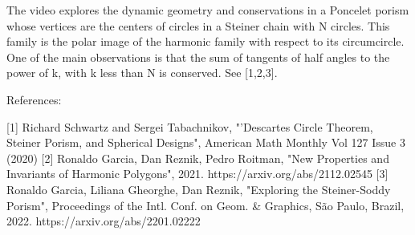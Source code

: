 The video explores the dynamic geometry and conservations in a Poncelet porism whose vertices are the centers of circles in a Steiner chain with N circles. This family is the polar image of the harmonic family with respect to its circumcircle. One of the main observations is that the sum of tangents of half angles to the power of k, with k less than N is conserved. See [1,2,3].

References:

[1] Richard Schwartz and Sergei Tabachnikov,  "'Descartes Circle Theorem, Steiner Porism, and Spherical Designs", American Math Monthly Vol 127 Issue 3 (2020)
[2] Ronaldo Garcia, Dan Reznik, Pedro Roitman, "New Properties and Invariants of Harmonic Polygons", 2021. https://arxiv.org/abs/2112.02545
[3] Ronaldo Garcia, Liliana Gheorghe, Dan Reznik, "Exploring the Steiner-Soddy Porism", Proceedings of the Intl. Conf. on Geom. & Graphics, São Paulo, Brazil, 2022. https://arxiv.org/abs/2201.02222